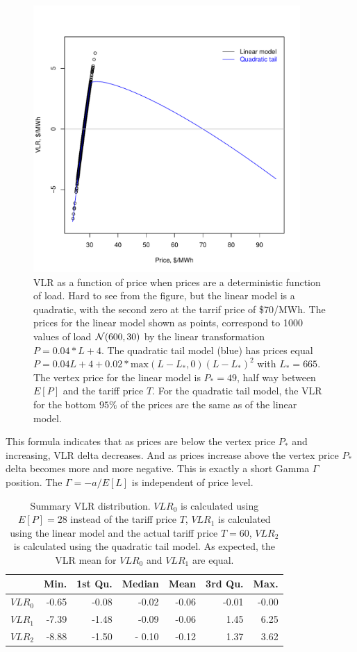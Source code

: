 \documentclass[12pt]{article}
\begin{document}
\begin{figure}[htb]
\begin{center}
\includegraphics[height=4in,width=4in,angle=0]{img/vlr_vs_price.pdf}
\caption{VLR as a function of price when prices are a deterministic
  function of load.  Hard to see from the figure, but the linear model
  is a quadratic, with the second zero at the tarrif price of
  \$70/MWh. The prices for the linear model shown as points,
  correspond to 1000 values of load ${\cal N}(600,30)$ by the linear
  transformation $P=0.04*L + 4$.  The quadratic tail model (blue) has
  prices equal $P = 0.04L + 4 + 0.02*\mathrm{max}(L-L_*,0)(L-L_*)^2$
  with $L_*=665$. The vertex price for the linear model is $P_*=49$,
  half way between $E[P]$ and the tariff price $T$.  For the quadratic
  tail model, the VLR for the bottom $95\%$ of the prices are the same
  as of the linear model.}
\label{vlrVsPrice}
\end{center}
\end{figure}


This formula indicates that as prices are below the vertex price $P_*$ and
increasing, VLR delta decreases.  And as prices increase above the
vertex price $P_*$ delta becomes more and more negative.  This is
exactly a short Gamma $\Gamma$ position.  The $\Gamma = -a/E[L]$
is independent of price level.

\begin{table}[ht]
\centering
 \label{summaryVlr}
 \begin{tabular}{rrrrrrr}
  \hline
 & Min. & 1st Qu. & Median & Mean & 3rd Qu. & Max. \\ 
  \hline
  $VLR_0$ & -0.65 & -0.08 & -0.02 & -0.06 & -0.01 & -0.00 \\
  $VLR_1$ & -7.39 & -1.48 & -0.09 & -0.06 & 1.45 & 6.25 \\
  $VLR_2$ & -8.88 & -1.50 & - 0.10 & -0.12 & 1.37 & 3.62 \\
   \hline
 \end{tabular}
 \caption{Summary VLR distribution.  $VLR_0$ is calculated using
   $E[P]=28$ instead of the tariff price $T$, $VLR_1$ is calculated
   using the linear model and the actual tariff price $T=60$, $VLR_2$
   is calculated using the quadratic tail model.  As expected, the VLR
   mean for $VLR_0$ and $VLR_1$ are equal.  }
\end{table}
\end{document}
